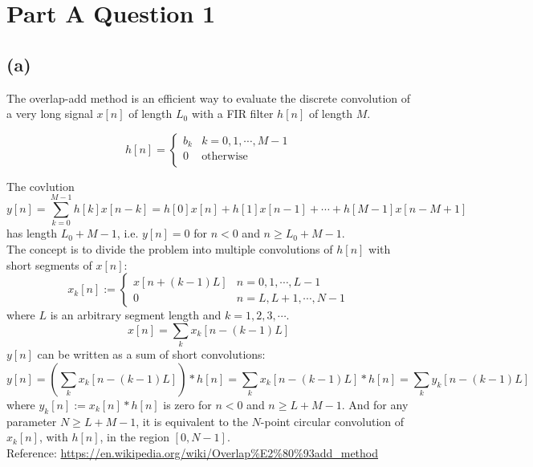 \documentclass{article}
\newenvironment{homeworkProblem}[1]{
	\section*{#1}
	}{
}
\newenvironment{homeworkSection}[1]{
	\subsection*{#1}
	}{
}
\begin{document}
\newpage


\begin{homeworkProblem}{Part A Question 1}


\begin{homeworkSection}{(a)}

The overlap-add method is an efficient way to evaluate the discrete convolution of a very long signal $x[n]$ of length $L_0$ with a FIR filter $h[n]$ of length $M$.

\begin{equation}
h[n] =
\begin{cases}
b_k & k = 0, 1, \cdots, M-1\\
0 & \text{otherwise}\\ 
\end{cases}
\end{equation}

The covlution
\begin{equation}
y[n] = \sum_{k=0}^{M-1} h[k]x[n-k] = h[0]x[n] + h[1]x[n-1] + \cdots + h[M-1]x[n-M+1]
\end{equation}
has length $L_0+M-1$, i.e. $y[n]=0$ for $n<0$ and $n \ge L_0+M-1$.\\

The concept is to divide the problem into multiple convolutions of $h[n]$ with short segments of $x[n]$:
\begin{equation}
x_k[n] :=
\begin{cases}
x[n+(k-1)L] & n=0, 1, \cdots, L-1\\
0 & n= L, L+1, \cdots, N-1
\end{cases}
\end{equation}
where $L$ is an arbitrary segment length and $k=1, 2, 3, \cdots$.
\begin{equation}
x[n] = \sum_{k} x_k[n-(k-1)L]
\end{equation}
$y[n]$ can be written as a sum of short convolutions:
\begin{equation}
y[n] = \left( \sum_{k} x_k[n-(k-1)L] \right) * h[n] = \sum_{k} x_k[n-(k-1)L] * h[n] = \sum_{k} y_k[n-(k-1)L]
\end{equation}
where $y_k[n] := x_k[n] * h[n]$ is zero for $n<0$ and $n \ge L+M-1$. And for any parameter $N\ge L+M-1$, it is equivalent to the $N$-point circular convolution of $x_k[n]$, with $h[n]$, in the region $[0, N-1]$.\\

Reference: \url{https://en.wikipedia.org/wiki/Overlap%E2%80%93add_method}

\end{homeworkSection}


\end{homeworkProblem}
\end{document}
